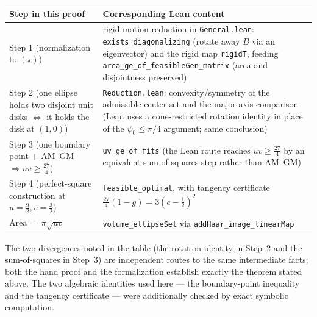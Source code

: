 \documentclass[11pt]{article}
\begin{document}
\begin{center}
\renewcommand{\arraystretch}{1.25}
\begin{tabular}{@{}p{}p{}@{}}
\hline
\textbf{Step in this proof} & \textbf{Corresponding Lean content}\\
\hline
Step 1 (normalization to $(\star)$) & rigid-motion reduction in \texttt{General.lean}:
  \texttt{exists\_diagonalizing} (rotate away $B$ via an eigenvector) and the rigid map
  \texttt{rigidT}, feeding \texttt{area\_ge\_of\_feasibleGen\_matrix} (area and disjointness preserved)\\
Step 2 (one ellipse holds two disjoint unit disks $\iff$ it holds the disk at $(1,0)$)
  & \texttt{Reduction.lean}: convexity/symmetry of the admissible-center set and the major-axis
  comparison (Lean uses a cone-restricted rotation identity in place of the $\psi_0\le\pi/4$ argument;
  same conclusion)\\
Step 3 (one boundary point $+$ AM--GM $\Rightarrow uv\ge\tfrac{27}{4}$)
  & \texttt{uv\_ge\_of\_fits} (the Lean route reaches $uv\ge\tfrac{27}{4}$ by an equivalent
  sum-of-squares step rather than AM--GM)\\
Step 4 (perfect-square construction at $u=\tfrac92,v=\tfrac32$)
  & \texttt{feasible\_optimal}, with tangency certificate
  $\tfrac{27}{4}(1-g)=3(c-\tfrac12)^2$\\
Area $=\pi\sqrt{uv}$ & \texttt{volume\_ellipseSet} via \texttt{addHaar\_image\_linearMap}\\
\hline
\end{tabular}
\end{center}

\noindent The two divergences noted in the table (the rotation identity in Step~2 and the
sum-of-squares in Step~3) are independent routes to the same intermediate facts; both the hand proof
and the formalization establish exactly the theorem stated above. The two algebraic identities used
here --- the boundary-point inequality and the tangency certificate --- were additionally checked by
exact symbolic computation.
\end{document}
